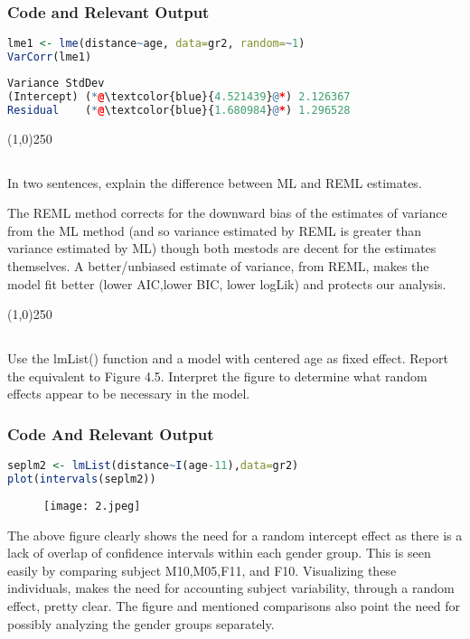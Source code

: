 \documentclass[a4paper]{article}
\begin{document}
\subsubsection{Code and Relevant Output}
\begin{lstlisting}[language=R]
lme1 <- lme(distance~age, data=gr2, random=~1)
VarCorr(lme1)
\end{lstlisting}
\begin{lstlisting}[language=R,frame=none]
	    Variance StdDev  
(Intercept) (*@\textcolor{blue}{4.521439}@*) 2.126367
Residual    (*@\textcolor{blue}{1.680984}@*) 1.296528
\end{lstlisting}
\begin{center}
\line(1,0){250}
\end{center}



\subsection{}
\begin{flushleft}
In two sentences, explain the difference between ML and REML estimates.
\end{flushleft}
The REML method corrects for the downward bias of the estimates of variance from the ML method (and so variance estimated by REML is greater than variance estimated by ML) though both mestods are decent for the estimates themselves. A better/unbiased estimate of variance, from REML, makes the model fit better (lower AIC,lower BIC, lower logLik) and protects our analysis.
\begin{center}
\line(1,0){250}
\end{center}



\subsection{}Use the lmList() function and a model with centered age as fixed effect. Report the equivalent to Figure 4.5. Interpret the figure to determine what random effects appear to be necessary in the model.
\subsubsection{Code And Relevant Output}
\begin{lstlisting}[language=R]
seplm2 <- lmList(distance~I(age-11),data=gr2)
plot(intervals(seplm2))
\end{lstlisting}
\begin{figure}[H]
\centering
\texttt{[image: 2.jpeg]}\\
\end{figure}
The above figure  clearly shows the need for a random intercept effect as there is a lack of overlap of confidence intervals within each gender group. This is seen easily by comparing subject M10,M05,F11, and F10. Visualizing these individuals, makes the need for accounting subject variability, through a random effect, pretty clear. The figure and mentioned comparisons also point the need for possibly analyzing the gender groups separately.
\end{document}
